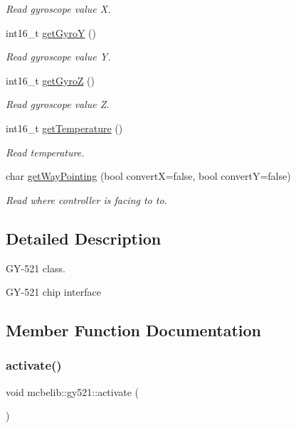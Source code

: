 \begin{DoxyCompactItemize}
\begin{DoxyCompactList}\small\item\em Read gyroscope value X. \end{DoxyCompactList}\item 
int16\+\_\+t \hyperlink{classmcbelib_1_1gy521_a8b9cec4004f71c70c3a14b5f6fbf9e4d}{get\+GyroY} ()
\begin{DoxyCompactList}\small\item\em Read gyroscope value Y. \end{DoxyCompactList}\item 
int16\+\_\+t \hyperlink{classmcbelib_1_1gy521_a197222a217acdbf8260e9495120497a0}{get\+GyroZ} ()
\begin{DoxyCompactList}\small\item\em Read gyroscope value Z. \end{DoxyCompactList}\item 
int16\+\_\+t \hyperlink{classmcbelib_1_1gy521_abb1275aa14cf35844900e91fded2bad0}{get\+Temperature} ()
\begin{DoxyCompactList}\small\item\em Read temperature. \end{DoxyCompactList}\item 
char \hyperlink{classmcbelib_1_1gy521_af0d109f92f90dd9c4ae28c6fdacd9a88}{get\+Way\+Pointing} (bool convertX=false, bool convertY=false)
\begin{DoxyCompactList}\small\item\em Read where controller is facing to to. \end{DoxyCompactList}\end{DoxyCompactItemize}


\subsection{Detailed Description}
G\+Y-\/521 class. 

G\+Y-\/521 chip interface 

\subsection{Member Function Documentation}
\mbox{\label{classmcbelib_1_1gy521_a3d894d6a553ab6ed660886c349f2f7bf}} 
\subsubsection{\texorpdfstring{activate()}{activate()}}
{\footnotesize\ttfamily void mcbelib\+::gy521\+::activate (\begin{DoxyParamCaption}{ }\end{DoxyParamCaption})}



